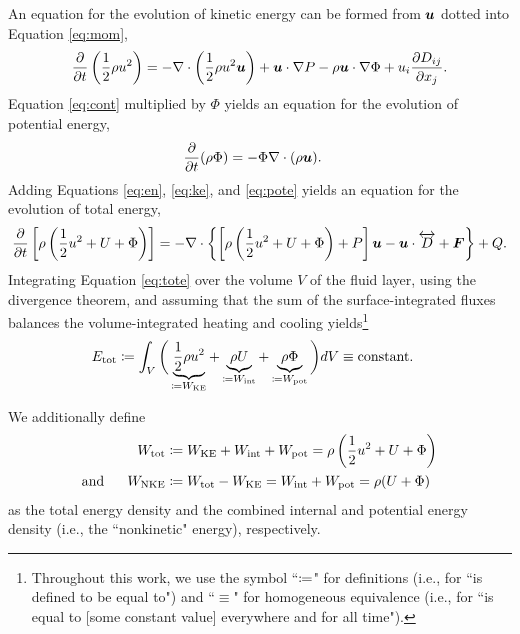 \documentclass[12pt]{article}
\newcommand{\vecf}{\bm{F}}
\newcommand{\etot}{E_{\rm tot}}
\newcommand{\wtot}{W_{\rm tot}}
\newcommand{\wke}{W_{\rm KE}}
\newcommand{\wnke}{W_{\rm NKE}}
\newcommand{\wint}{W_{\rm int}}
\newcommand{\wpot}{W_{\rm pot}}
\begin{document}
	An equation for the evolution of kinetic energy can be formed from $\bm{u}$ dotted into Equation \eqref{eq:mom},
	\begin{align}\label{eq:ke}
		\frac{\partial}{\partial t}\left(\frac{1}{2}\rho u^2\right) = - \nabla\cdot\left(\frac{1}{2}\rho u^2\bm{u} \right) + \bm{u}\cdot\nabla P - \rho\bm{u}\cdot\nabla\Phi+ u_i\frac{\partial D_{ij}}{\partial x_j}.
	\end{align}
	Equation \eqref{eq:cont} multiplied by $\Phi$ yields an equation for the evolution of potential energy,
	\begin{align}\label{eq:pote}
		\frac{\partial}{\partial t}(\rho\Phi) &= - \Phi \nabla\cdot(\rho\bm{u}).
	\end{align}
	Adding Equations \eqref{eq:en}, \eqref{eq:ke}, and \eqref{eq:pote} yields an equation for the evolution of total energy,
	\begin{align}\label{eq:tote}
		\pderiv{}{t}\left[\rho\left(\frac{1}{2} u^2 + U + \Phi\right)\right] = -\Div\left\{\left[\rho\left(\frac{1}{2} u^2 + U + \Phi\right) + P\right]\vecu- \vecu\cdot\overleftrightarrow{D} + \vecf\right\} + Q.
	\end{align}
	Integrating Equation \eqref{eq:tote} over the volume $V$ of the fluid layer, using the divergence theorem, and assuming that the sum of the surface-integrated fluxes balances the volume-integrated heating and cooling yields\footnote{Throughout this work, we use the symbol ``$\coloneqq$" for definitions (i.e., for ``is defined to be equal to") and ``$\equiv$" for homogeneous equivalence (i.e., for ``is equal to [some constant value] everywhere and for all time").}
	\begin{align}\label{eq:econst}
		\etot &\define \int_V \bigg{(}\underbrace{\frac{1}{2}\rho u^2}_{\define\wke} +\underbrace{\rho U}_{\define\wint} +  \underbrace{\rho \Phi}_{\define\wpot}\bigg{)}dV\equiv \text{constant}.
	\end{align}
	
	We additionally define
	\begin{subequations}\label{eq:wtotnke}
	\begin{align}
	 \wtot &\define \wke + \wint + \wpot = \rho\left(\frac{1}{2}u^2 + U + \Phi\right)\label{eq:wtot}\\
		\andd \wnke &\define \wtot - \wke = \wint + \wpot =\rho (U + \Phi)\label{eq:wnke}
	\end{align}
	\end{subequations}
	as the total energy density and the combined internal and potential energy density (i.e., the ``nonkinetic" energy), respectively.
	
\end{document}
